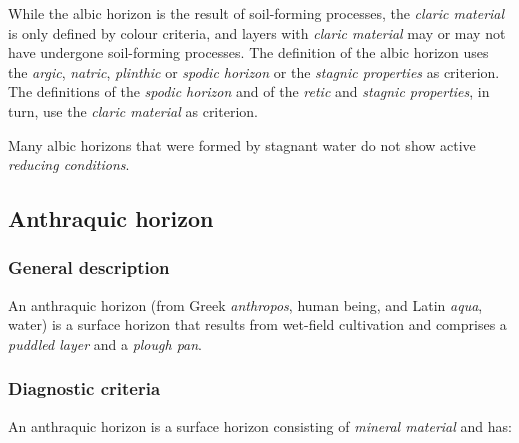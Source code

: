 \documentclass[
  letterpaper,
  DIV=11,
  numbers=noendperiod]{scrreprt}
\begin{document}
While the albic horizon is the result of soil-forming processes, the
\emph{claric material} is only defined by colour criteria, and layers
with \emph{claric material} may or may not have undergone soil-forming
processes. The definition of the albic horizon uses the \emph{argic},
\emph{natric}, \emph{plinthic} or \emph{spodic horizon} or the
\emph{stagnic properties} as criterion. The definitions of the
\emph{spodic horizon} and of the \emph{retic} and \emph{stagnic
properties}, in turn, use the \emph{claric material} as criterion.

Many albic horizons that were formed by stagnant water do not show
active \emph{reducing conditions}.

\hypertarget{anthraquic-horizon}{%
\subsection{Anthraquic horizon}\label{anthraquic-horizon}}

\hypertarget{general-description-1}{%
\subsubsection{General description}\label{general-description-1}}

An anthraquic horizon (from Greek \emph{anthropos}, human being, and
Latin \emph{aqua}, water) is a surface horizon that results from
wet-field cultivation and comprises a \emph{puddled layer} and a
\emph{plough pan}.

\hypertarget{diagnostic-criteria-1}{%
\subsubsection{Diagnostic criteria}\label{diagnostic-criteria-1}}

An anthraquic horizon is a surface horizon consisting of \emph{mineral
material} and has:
\end{document}
